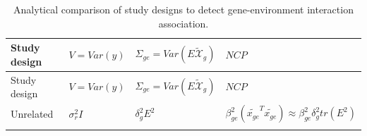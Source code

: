 \documentclass[]{book}
\begin{document}
\begin{longtable}[]{@{}llll@{}}
\caption{\label{tab:assoc-ge} Analytical comparison of study designs to
detect gene-environment interaction association.}\tabularnewline
\toprule
\begin{minipage}[b]{0.15\columnwidth}\raggedright\strut
Study design\strut
\end{minipage} & \begin{minipage}[b]{0.16\columnwidth}\raggedright\strut
\(V = Var(y)\)\strut
\end{minipage} & \begin{minipage}[b]{0.17\columnwidth}\raggedright\strut
\(\Sigma_{ge} = Var(E \mathcal{\tilde{X}}_g)\)\strut
\end{minipage} & \begin{minipage}[b]{0.40\columnwidth}\raggedright\strut
\(NCP\)\strut
\end{minipage}\tabularnewline
\midrule
\endfirsthead
\toprule
\begin{minipage}[b]{0.15\columnwidth}\raggedright\strut
Study design\strut
\end{minipage} & \begin{minipage}[b]{0.16\columnwidth}\raggedright\strut
\(V = Var(y)\)\strut
\end{minipage} & \begin{minipage}[b]{0.17\columnwidth}\raggedright\strut
\(\Sigma_{ge} = Var(E \mathcal{\tilde{X}}_g)\)\strut
\end{minipage} & \begin{minipage}[b]{0.40\columnwidth}\raggedright\strut
\(NCP\)\strut
\end{minipage}\tabularnewline
\midrule
\endhead
\begin{minipage}[t]{0.15\columnwidth}\raggedright\strut
Unrelated\strut
\end{minipage} & \begin{minipage}[t]{0.16\columnwidth}\raggedright\strut
\(\sigma_r^2 I\)\strut
\end{minipage} & \begin{minipage}[t]{0.17\columnwidth}\raggedright\strut
\(\delta_g^2 E^2\)\strut
\end{minipage} & \begin{minipage}[t]{0.40\columnwidth}\raggedright\strut
\(\beta^2_{ge} (\tilde{x_{ge}}^T \tilde{x_{ge}}) \approx \beta^2_{ge} \delta_g^2 tr(E^2)\)\strut
\end{minipage}\tabularnewline
\begin{minipage}[t]{0.15\columnwidth}\raggedright\strut

\end{minipage}
\end{longtable}
\end{document}
